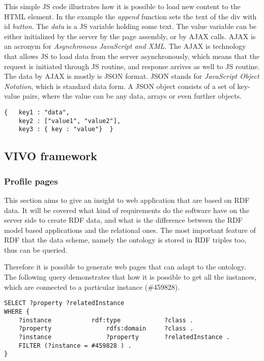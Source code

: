 This simple JS code illustrates how it is possible to load new content to the HTML element. In the example the \textit{append} function sets the text of the div with id \textit{button}. The \textit{data} is a JS variable holding
some text. The value variable can be either initialized by the server by the page assembly, or by AJAX calls. AJAX is an acronym for \textit{Asynchronous JavaScript and XML}. The AJAX is technology that allows JS to load data from the server asynchronously, which means that the request is initiated through JS routine, and response arrives as well to JS routine. The data by AJAX is mostly is JSON format. JSON stands for \textit{JavaScript Object Notation}, which is standard data form. A JSON object consists of a set of key-value pairs, where the value can be any data, arrays or even further objects.

\begin{lstlisting}[captionpos=b, caption=JSON object example, label=jsListing, belowskip=1em, aboveskip=2em,
basicstyle=\footnotesize,frame=single]
{	key1 : "data",
	key2 : ["value1", "value2"],
	key3 : { key : "value"}  }
\end{lstlisting}


\subsection{VIVO framework} \label{233}


\subsubsection{Profile pages} \label{233}



This section aims to give an insight to web application that are based on RDF data. It will be covered what kind of requirements do the software have on the server side to create RDF data, and what is the difference between the RDF model based applications and the relational ones. The most important feature of RDF that the data scheme, namely the ontology is stored in RDF triples too, thus can be queried.


Therefore it is possible to generate web pages that can adapt to the ontology. The following query demonstrates that how it is possible to get all the instances, which are connected to a particular instance (\#459828).

\begin{lstlisting}[captionpos=b, caption= Dynamic SPARQL query, label=skullJSON, belowskip=1em, aboveskip=2em,
basicstyle=\footnotesize,frame=single]
SELECT ?property ?relatedInstance
WHERE {
	?instance 			rdf:type  			?class .  
	?property				rdfs:domain		?class .
	?instance				?property 		?relatedInstance .
	FILTER (?instance = #459828 ) .
}
\end{lstlisting}

